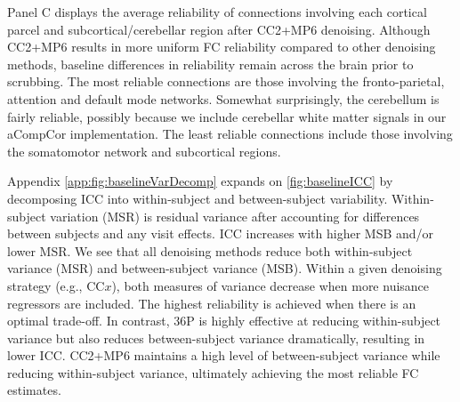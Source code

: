 \documentclass{article}
\begin{document}

Panel C displays the average reliability of connections involving each cortical parcel and subcortical/cerebellar region after CC2+MP6 denoising. Although CC2+MP6 results in more uniform FC reliability compared to other denoising methods, baseline differences in reliability remain across the brain prior to scrubbing. The most reliable connections are those involving the fronto-parietal, attention and default mode networks. Somewhat surprisingly, the cerebellum is fairly reliable, possibly because we include cerebellar white matter signals in our aCompCor implementation. The least reliable connections include those involving the somatomotor network and subcortical regions. %

Appendix \autoref{app:fig:baselineVarDecomp} expands on \autoref{fig:baselineICC} by decomposing ICC into within-subject and between-subject variability.  Within-subject variation (MSR) is residual variance after accounting for differences between subjects and any visit effects. ICC increases with higher MSB and/or lower MSR. We see that all denoising methods reduce both within-subject variance (MSR) and between-subject variance (MSB). Within a given denoising strategy (e.g., CC$x$), both measures of variance decrease when more nuisance regressors are included. The highest reliability is achieved when there is an optimal trade-off. In contrast, 36P is highly effective at reducing within-subject variance but also reduces between-subject variance dramatically, resulting in lower ICC. CC2+MP6 maintains a high level of between-subject variance while reducing within-subject variance, ultimately achieving the most reliable FC estimates. 

\end{document}
